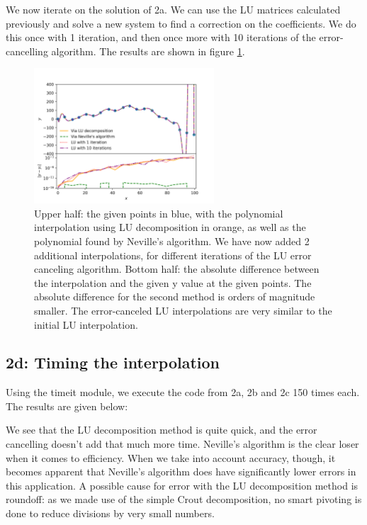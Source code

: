 We now iterate on the solution of 2a. We can use the LU matrices calculated previously and solve a new system to find a correction on the coefficients. We do this once with 1 iteration, and then once more with 10 iterations of the error-cancelling algorithm. The results are shown in figure \ref{fig:2c}.

\begin{figure}[h!]
\label{fig:2c}
\caption{Upper half: the given points in blue, with the polynomial interpolation using LU decomposition in orange, as well as the polynomial found by Neville's algorithm. We have now added 2 additional interpolations, for different iterations of the LU error canceling algorithm. Bottom half: the absolute difference between the interpolation and the given y value at the given points. The absolute difference for the second method is orders of magnitude smaller. The error-canceled LU interpolations are very similar to the initial LU interpolation.}
\centering
\includegraphics[width=0.6\textwidth]{my_vandermonde_sol_2c.png}
\end{figure}



\subsection{2d: Timing the interpolation}

Using the timeit module, we execute the code from 2a, 2b and 2c 150 times each. The results are given below:



We see that the LU decomposition method is quite quick, and the error cancelling doesn't add that much more time. Neville's algorithm is the clear loser when it comes to efficiency. When we take into account accuracy, though, it becomes apparent that Neville's algorithm does have significantly lower errors in this application. A possible cause for error with the LU decomposition method is roundoff: as we made use of the simple Crout decomposition, no smart pivoting is done to reduce divisions by very small numbers. 

